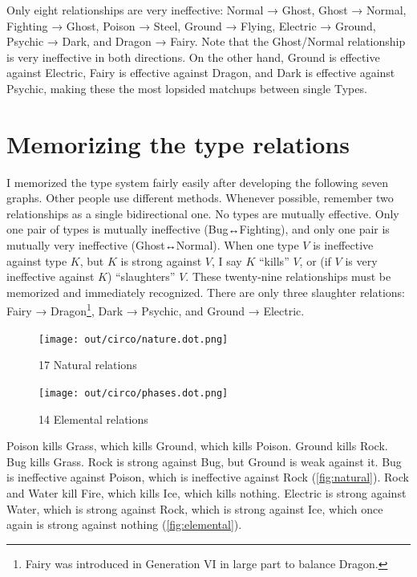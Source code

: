 Only eight relationships are very ineffective:
Normal → Ghost,
Ghost → Normal,
Fighting → Ghost,
Poison → Steel,
Ground → Flying,
Electric → Ground,
Psychic → Dark,
and Dragon → Fairy.
Note that the Ghost/Normal relationship is very ineffective in both directions.
On the other hand, Ground is effective against Electric, Fairy is effective
 against Dragon, and Dark is effective against Psychic, making these the most
 lopsided matchups between single Types.

\section{Memorizing the type relations}
I memorized the type system fairly easily after developing the following seven graphs.
Other people use different methods.
Whenever possible, remember two relationships as a single bidirectional one.
No types are mutually effective.
  Only one pair of types is mutually ineffective (Bug↔Fighting),
  and only one pair is mutually very ineffective (Ghost↔Normal).
When one type $V$ is ineffective against type $K$, but $K$ is strong
 against $V$, I say $K$ ``kills'' $V$, or
 (if $V$ is very ineffective against $K$) ``slaughters'' $V$.
These twenty-nine relationships must be memorized and immediately recognized.
There are only three slaughter relations: Fairy → Dragon\footnote{Fairy was
  introduced in Generation VI in large part to balance Dragon.}, Dark → Psychic,
  and Ground → Electric.

\begin{figure}[h!]
  \begin{minipage}[t]{0.5\textwidth}
    \texttt{[image: out/circo/nature.dot.png]}
    \caption{17 Natural relations}
    \label{fig:natural}
  \end{minipage}
  \begin{minipage}[t]{0.5\textwidth}
    \texttt{[image: out/circo/phases.dot.png]}
    \caption{14 Elemental relations}
    \label{fig:elemental}
  \end{minipage}
\end{figure}
\noindent{}Poison kills Grass, which kills Ground, which kills Poison.
Ground kills Rock.
Bug kills Grass.
Rock is strong against Bug, but Ground is weak against it.
Bug is ineffective against Poison, which is ineffective against Rock (\autoref{fig:natural}).
Rock and Water kill Fire, which kills Ice, which kills nothing.
Electric is strong against Water, which is strong against Rock, which is strong against Ice,
 which once again is strong against nothing (\autoref{fig:elemental}).

